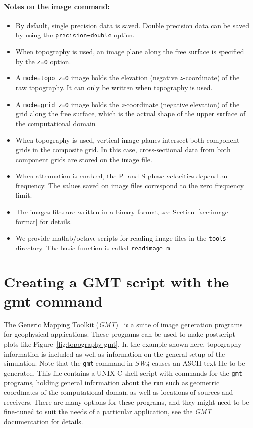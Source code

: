 \documentclass[11pt]{report}
\begin{document}
\paragraph{Notes on the image command:}
\begin{itemize}
\item By default, single precision data is saved. Double precision data can be saved by
  using the {\tt precision=double} option.
\item When topography is used, an image plane along the free surface is specified by the {\tt z=0} option.
\item A {\tt mode=topo z=0} image holds the elevation (negative $z$-coordinate) of the raw
  topography. It can only be written when topography is used.
\item A {\tt mode=grid z=0} image holds the $z$-coordinate (negative elevation) of the grid along
  the free surface, which is the actual shape of the upper surface of the computational domain.
\item When topography is used, vertical image planes intersect both component
grids in the composite grid. In this case, cross-sectional data from both component grids are stored
on the image file.
\item When attenuation is enabled, the P- and S-phase velocities depend on frequency. The values
  saved on image files correspond to the zero frequency limit.
\item The images files are written in a binary format, see Section~\ref{sec:image-format} for
  details.
\item We provide matlab/octave scripts for reading image files in the {\tt tools} directory. The
  basic function is called {\tt readimage.m}. 
\end{itemize}

\section{Creating a GMT script with the gmt command}\label{sec:gmt}
The Generic Mapping Toolkit (\emph{GMT})~\cite{WesselSmithGMT} is a suite of image generation
programs for geophysical applications. These programs can be used to make postscript plots like
Figure~\ref{fig:topography-gmt}. In the example shown here, topography information is included as
well as information on the general setup of the simulation. Note that the {\tt gmt} command in
\emph{SW4} causes an ASCII text file to be generated. This file contains a UNIX C-shell script with
commands for the \verb+gmt+ programs, holding general information about the run such as geometric
coordinates of the computational domain as well as locations of sources and receivers. There are
many options for these programs, and they might need to be fine-tuned to suit the needs of a particular
application, see the \emph{GMT} documentation for details. 
\end{document}

